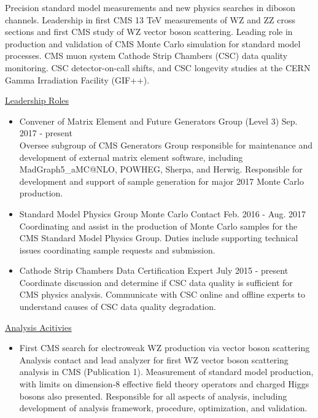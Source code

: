 \documentclass[10pt]{res} %
\begin{document}
\begin{resume}
Precision standard model measurements and new physics searches in diboson channels. Leadership in
first CMS 13 TeV measurements of WZ and ZZ cross sections and first CMS study of WZ vector boson scattering.
Leading role in production and validation of CMS Monte Carlo simulation for standard model
processes. CMS muon system Cathode Strip Chambers (CSC) data quality monitoring.
CSC detector-on-call shifts, and CSC longevity studies at the
CERN Gamma Irradiation Facility (GIF++).

\underline{Leadership Roles}
\vspace{2mm}
\begin{itemize}
  \item{Convener of Matrix Element and Future Generators Group (Level 3) \hfill{Sep. 2017 - present}} \\
    Oversee subgroup of CMS Generators Group
    responsible for maintenance and development of external matrix element software, 
    including MadGraph5\_aMC@NLO, POWHEG, Sherpa, and Herwig. Responsible for development and support of sample generation for
    major 2017 Monte Carlo production.
  \item{Standard Model Physics Group Monte Carlo Contact \hfill{Feb. 2016 - Aug. 2017}} \\
    Coordinating and assist 
    in the production of Monte Carlo samples for the CMS Standard Model Physics Group. 
    Duties include supporting technical issues coordinating sample requests and submission.
  \item{Cathode Strip Chambers Data Certification Expert \hfill{July 2015 - present}} \\
    Coordinate discussion and determine if
    CSC data quality is sufficient for CMS physics analysis.
    Communicate with CSC online and offline experts to understand
    causes of CSC data quality degradation.
\end{itemize}

\underline{Analysis Acitivies}
\vspace{2mm}
\begin{itemize}
  \item{First CMS search for electroweak WZ production via vector boson scattering}\\
    Analysis contact and lead analyzer for first WZ vector boson scattering analysis in CMS (Publication 1). 
    Measurement of standard model production, with limits on dimension-8 
    effective field theory operators and charged Higgs bosons also presented.
    Responsible for all aspects of analysis, 
    including development of analysis framework, procedure, optimization, and validation. 


\end{itemize}
\end{resume}
\end{document}

